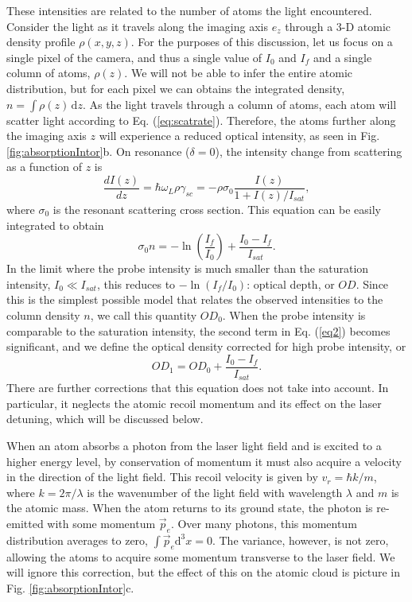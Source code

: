 \documentclass[12pt]{iopart}
\begin{document}
\par These intensities are related to the number of atoms the light encountered. Consider the light as it travels along the imaging axis $e_z$ through a 3-D atomic density profile $\rho(x,y,z)$. For the purposes of this discussion, let us focus on a single pixel of the camera, and thus a single value of $I_0$ and $I_f$ and a single column of atoms, $\rho(z)$. We will not be able to infer the entire atomic distribution, but for each pixel we can obtains the integrated density, $n = \int \rho\left(z\right) \,\mathrm{d}z$. As the light travels through a column of atoms, each atom will scatter light according to Eq. (\ref{eq:scatrate}). Therefore, the atoms further along the imaging axis $z$ will experience a reduced optical intensity, as seen in Fig. \ref{fig:absorptionIntor}b. On resonance ($\delta=0$), the intensity change from scattering as a function of $z$ is
\begin{equation}
\frac{dI(z)}{dz}=\hbar\omega_L\rho\gamma_{sc}=-\rho\sigma_0\frac{I(z)}{1+I(z)/I_{sat}},
\end{equation}
where $\sigma_0$ is the resonant scattering cross section. 
 This equation can be easily integrated to obtain  \cite{Reinaudi07}
\begin{equation} 
\sigma_0 n = -\ln\left(\frac{I_f}{I_0}\right) + \frac{I_0-I_f}{I_{sat}}.
\label{eq2}
\end{equation}
In the limit where the probe intensity is much smaller than the saturation intensity, $I_0\ll I_{sat}$, this reduces to $-\ln \left(I_f/I_0\right)$: optical depth, or $OD$. Since this is the simplest possible model that relates the observed intensities to the column density $n$, we call this quantity $OD_0$. When the probe intensity is comparable to the saturation intensity, the second term in Eq. (\ref{eq2}) becomes significant, and we define the optical density corrected for high probe intensity, or
\begin{equation} 
OD_1 = OD_0 + \frac{I_0-I_f}{I_{sat}}.
\label{eq:OD1}
\end{equation}
There are further corrections that this equation does not take into account. In particular, it neglects the atomic recoil momentum and its effect on the laser detuning, which will be discussed below.
\par When an atom absorbs a photon from the laser light field and is excited to a higher energy level, by conservation of momentum it must also acquire a velocity in the direction of the light field. This recoil velocity is given by $v_r=\hbar k/m$, where $k=2\pi/\lambda$ is the wavenumber of the light field with wavelength $\lambda$ and $m$ is the atomic mass. When the atom returns to its ground state, the photon is re-emitted with some momentum $\vec{p}_e$. Over many photons, this momentum distribution averages to zero, $\int\vec{p}_e\mathrm{d}^3 x=0$.  The variance, however, is not zero, allowing the atoms to acquire some momentum transverse to the laser field. We will ignore this correction, but the effect of this on the atomic cloud is picture in Fig. \ref{fig:absorptionIntor}c. 
\end{document}
